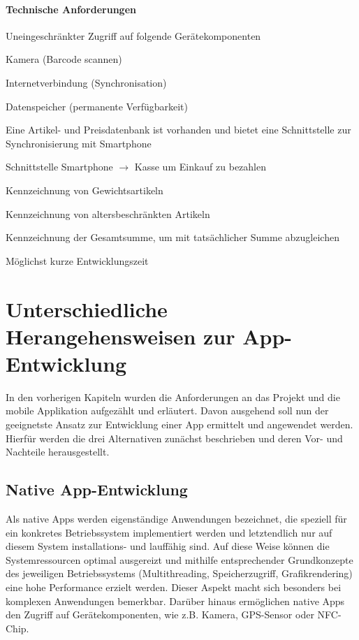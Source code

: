\paragraph{Technische Anforderungen}
\begin{seList}
	\item Uneingeschränkter Zugriff auf folgende Gerätekomponenten
	\begin{seList}
		\item Kamera (Barcode scannen)
		\item Internetverbindung (Synchronisation)
		\item Datenspeicher (permanente Verfügbarkeit)
	\end{seList}
	\item Eine Artikel- und Preisdatenbank ist vorhanden und bietet eine Schnittstelle zur Synchronisierung mit Smartphone
	\item Schnittstelle Smartphone $\rightarrow$ Kasse um Einkauf zu bezahlen
	\begin{seList}
		\item Kennzeichnung von Gewichtsartikeln
		\item Kennzeichnung von altersbeschränkten Artikeln
		\item Kennzeichnung der Gesamtsumme, um mit tatsächlicher Summe abzugleichen
	\end{seList}
	\item Möglichst kurze Entwicklungszeit
\end{seList}

\section{Unterschiedliche Herangehensweisen zur App-Entwicklung}
%
%
In den vorherigen Kapiteln wurden die Anforderungen an das Projekt und die mobile Applikation aufgezählt und erläutert. Davon ausgehend soll nun der geeignetste Ansatz zur Entwicklung einer App ermittelt und angewendet werden. Hierfür werden die drei Alternativen zunächst beschrieben und deren Vor- und Nachteile herausgestellt.

\subsection{Native App-Entwicklung}
Als native Apps werden eigenständige Anwendungen bezeichnet, die speziell für ein konkretes Betriebssystem implementiert werden und letztendlich nur auf diesem System installations- und lauffähig sind. Auf diese Weise können die Systemressourcen optimal ausgereizt und mithilfe entsprechender Grundkonzepte des jeweiligen Betriebssystems (Multithreading, Speicherzugriff, Grafikrendering) eine hohe Performance erzielt werden. Dieser Aspekt macht sich besonders bei komplexen Anwendungen bemerkbar. Darüber hinaus ermöglichen native Apps den Zugriff auf Gerätekomponenten, wie z.B. Kamera, GPS-Sensor oder NFC-Chip.
 
